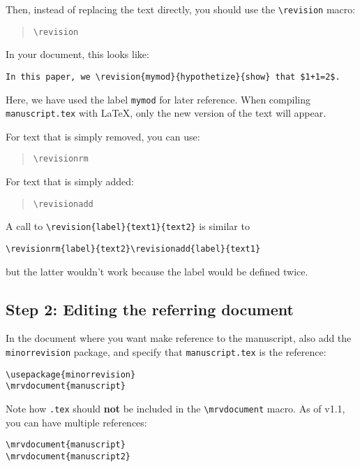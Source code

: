 \documentclass{ltxdoc}
\begin{document}
Then, instead of replacing the text directly, you should use the \verb|\revision| macro:
\begin{quote}
\verb|\revision|   
\end{quote}

In your document, this looks like:
\begin{verbatim}
In this paper, we \revision{mymod}{hypothetize}{show} that $1+1=2$.
\end{verbatim}

Here, we have used the label \verb|mymod| for later reference. When compiling
\verb|manuscript.tex| with LaTeX, only the new version of the text will appear.

For text that is simply removed, you can use:
\begin{quote}
\verb|\revisionrm|  
\end{quote}

For text that is simply added:
\begin{quote}
\verb|\revisionadd|  
\end{quote}

A call to \verb|\revision{label}{text1}{text2}| is similar to
\begin{verbatim}
\revisionrm{label}{text2}\revisionadd{label}{text1}
\end{verbatim}
but the latter wouldn't work because the label would be defined twice.

\subsection{Step 2: Editing the referring document}

In the document where you want make reference to the manuscript, also add the \verb|minorrevision| package, and specify that \verb|manuscript.tex| is the reference:

\begin{verbatim}
\usepackage{minorrevision}
\mrvdocument{manuscript}
\end{verbatim}

Note how \verb|.tex| should \textbf{not} be included in the \verb|\mrvdocument| macro.
As of v1.1, you can have multiple references:

\begin{verbatim}
\mrvdocument{manuscript}
\mrvdocument{manuscript2}
\end{verbatim}
\end{document}
